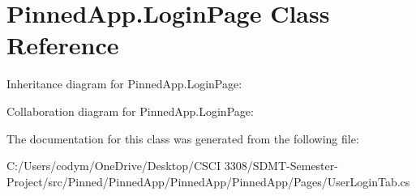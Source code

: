 \hypertarget{class_pinned_app_1_1_login_page}{}\section{Pinned\+App.\+Login\+Page Class Reference}
\label{class_pinned_app_1_1_login_page}


Inheritance diagram for Pinned\+App.\+Login\+Page\+:


Collaboration diagram for Pinned\+App.\+Login\+Page\+:


The documentation for this class was generated from the following file\+:\begin{DoxyCompactItemize}
\item 
C\+:/\+Users/codym/\+One\+Drive/\+Desktop/\+C\+S\+C\+I 3308/\+S\+D\+M\+T-\/\+Semester-\/\+Project/src/\+Pinned/\+Pinned\+App/\+Pinned\+App/\+Pinned\+App/\+Pages/User\+Login\+Tab.\+cs\end{DoxyCompactItemize}
